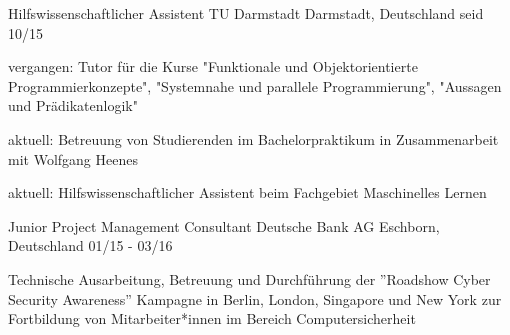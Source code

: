 

\begin{cventries}

  \cventry
    {Hilfswissenschaftlicher Assistent} %
    {TU Darmstadt} %
    {Darmstadt, Deutschland} %
    {seid 10/15} %
    {
      \begin{cvitems} %
        \item {vergangen: Tutor für die Kurse "Funktionale und Objektorientierte Programmierkonzepte", "Systemnahe und parallele Programmierung", "Aussagen und Prädikatenlogik"}
        \item {aktuell: Betreuung von Studierenden im Bachelorpraktikum in Zusammenarbeit mit Wolfgang Heenes}
        \item {aktuell: Hilfswissenschaftlicher Assistent beim Fachgebiet Maschinelles Lernen}
      \end{cvitems}
    }

  \cventry
    {Junior Project Management Consultant} %
    {Deutsche Bank AG} %
    {Eschborn, Deutschland} %
    {01/15 - 03/16} %
    {
      \begin{cvitems} %
        \item {Technische Ausarbeitung, Betreuung und Durchführung der ”Roadshow Cyber Security
Awareness” Kampagne in Berlin, London, Singapore und New York zur Fortbildung von Mitarbeiter*innen im Bereich Computersicherheit}
      \end{cvitems}
    }

\end{cventries}
